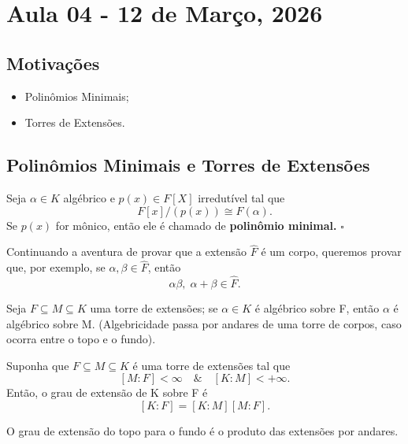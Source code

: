 \documentclass[../algebraIII_notes.tex]{subfiles}
\begin{document}
\section{Aula 04 - 12 de Março, 2026}
\subsection{Motivações}
\begin{itemize}
	\item Polinômios Minimais;
	\item Torres de Extensões.
\end{itemize}
\subsection{Polinômios Minimais e Torres de Extensões}
\begin{def*}
	Seja \(\alpha \in K\) algébrico e \(p(x)\in F[X]\) irredutível tal que
	\[
		F[x]/(p(x)) \cong F(\alpha ).
	\]
	Se \(p(x)\) for mônico, então ele é chamado de \textbf{polinômio minimal.} \(\square\)
\end{def*}
Continuando a aventura de provar que a extensão \(\hat{F}\) é um corpo, queremos provar que, por exemplo, se \(\alpha , \beta \in \hat{F}\), então
\[
	\alpha \beta ,\; \alpha +\beta \in \hat{F}.
\]
\begin{lemma*}
	Seja \(F\subseteq M\subseteq K\) uma torre de extensões; se \(\alpha \in K\) é algébrico sobre F, então \(\alpha \) é algébrico sobre M. (Algebricidade passa por andares de uma torre de corpos, caso ocorra entre o topo e o fundo).
\end{lemma*}
\begin{theorem*}
	Suponha que \(F\subseteq M\subseteq K\) é uma torre de extensões tal que
	\[
		[M:F]<\infty \quad\&\quad [K:M]<+\infty.
	\]
	Então, o grau de extensão de K sobre F é
	\[
		[K:F]=[K:M][M:F].
	\]
\end{theorem*}
O grau de extensão do topo para o fundo é o produto das extensões por andares.
\end{document}
